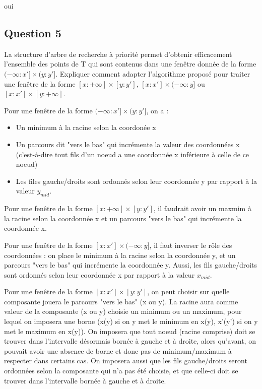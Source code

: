 \documentclass{article}
\newcommand{\gray}{\color{gray}}
\begin{document}
\bigskip

oui %

\newpage

\subsection{Question 5} La structure d'arbre de recherche à priorité permet d'obtenir efficacement l'ensemble
des points de T qui sont contenus dans une fenêtre donnée de la forme \\$(- \infty : x'] \times (y : y']$.
Expliquer comment adapter l'algorithme proposé pour traiter une fenêtre de la forme $[x : + \infty] \times [y : y']$,
$[x : x'] \times (- \infty : y]$ ou $[x : x'] \times [y : + \infty]$.


\bigskip

\gray
Pour une fenêtre de la forme $(- \infty : x'] \times (y : y']$, on a :
\begin{itemize}
    \item Un minimum à la racine selon la coordonée x
    \item Un parcours dit "vers le bas" qui incrémente la valeur des coordonnées x 
    (c'est-à-dire tout fils d'un noeud a une coordonnée x inférieure à celle de ce noeud)
    \item Les files gauche/droits sont ordonnés selon leur coordonnée y par rapport à la valeur $y_{mid}$.
\end{itemize}
Pour une fenêtre de la forme $[x : + \infty] \times [y : y']$, il faudrait avoir un maxmim à la racine selon la coordonnée x et un parcours "vers le bas" qui incrémente la coordonnée x. 

Pour une fenêtre de la forme $[x : x'] \times (- \infty : y]$, il faut inverser le rôle des coordonnées : on place le minimum à la racine selon la coordonnée y, et un parcours "vers le bas" qui
incrémente la coordonnée y. Aussi, les fils gauche/droits sont ordonnés selon leur coordonnée x par rapport à la valeur $x_{mid}$.

Pour une fenêtre de la forme $[x : x'] \times [y : y']$, on peut choisir sur quelle composante jouera le parcours "vers le bas" (x ou y). La racine aura comme valeur de la composante (x ou y) choisie
un minimum ou un maximum, pour lequel on imposera une borne (x(y) si on y met le minimum en x(y), x'(y') si on y met le maximum en x(y)). On imposera que tout noeud (racine comprise) doit se trouver dans l'intervalle désormais bornée
à gauche et à droite, alors qu'avant, on pouvait avoir une absence de borne et donc pas de minimum/maximum à respecter dans certains cas. On imposera aussi que les fils gauche/droits seront ordonnées selon la composante qui n'a
pas été choisie, et que celle-ci doit se trouver dans l'intervalle bornée à gauche et à droite.
\end{document}
